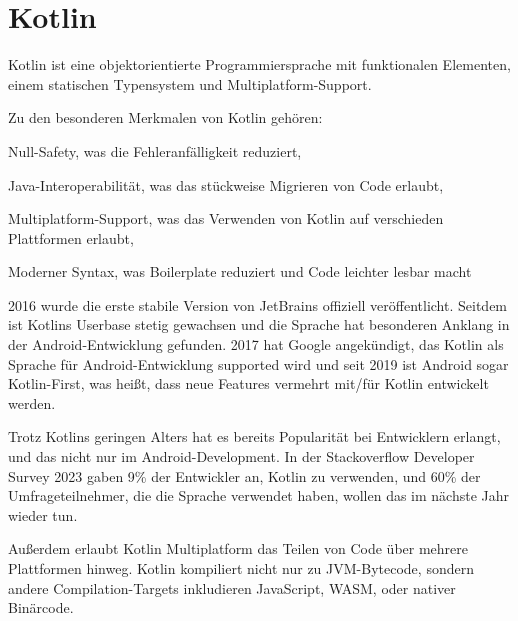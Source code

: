 
\chapter{Kotlin}\label{ch:kotlin}

Kotlin ist eine objektorientierte Programmiersprache mit funktionalen Elementen, einem statischen Typensystem und
Multiplatform-Support.

Zu den besonderen Merkmalen von Kotlin gehören:
\begin{liste}
    \item Null-Safety, was die Fehleranfälligkeit reduziert,
    \item Java-Interoperabilität, was das stückweise Migrieren von Code erlaubt,
    \item Multiplatform-Support, was das Verwenden von Kotlin auf verschieden Plattformen erlaubt,
    \item Moderner Syntax, was Boilerplate reduziert und Code leichter lesbar macht
\end{liste}

2016 wurde die erste stabile Version von JetBrains offiziell veröffentlicht.
Seitdem ist Kotlins Userbase
stetig gewachsen und die Sprache hat besonderen Anklang in der Android-Entwicklung gefunden.
2017 hat Google angekündigt, das Kotlin als Sprache für Android-Entwicklung supported wird und seit 2019 ist Android
sogar Kotlin-First, was heißt, dass neue Features vermehrt mit/für Kotlin entwickelt werden.

Trotz Kotlins geringen Alters hat es bereits Popularität bei Entwicklern erlangt, und das nicht nur im
Android-Development.
In der Stackoverflow Developer Survey 2023 gaben 9\% der Entwickler an, Kotlin zu verwenden, und 60\% der
Umfrageteilnehmer, die die Sprache verwendet haben, wollen das im nächste Jahr wieder tun.

Außerdem erlaubt Kotlin Multiplatform das Teilen von Code über mehrere Plattformen hinweg.
Kotlin kompiliert nicht nur zu JVM-Bytecode, sondern andere Compilation-Targets inkludieren JavaScript, WASM, oder
nativer Binärcode.









